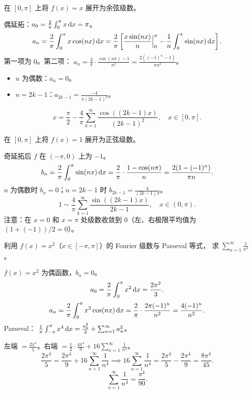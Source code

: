 \documentclass{ctexart}
\begin{document}
\begin{exercise}
  在 $[0,\pi]$ 上将 $f(x) = x$ 展开为余弦级数。
\end{exercise}

\begin{solution}
  偶延拓：$a_0 = \frac{2}{\pi}\int_0^\pi x \,\mathrm{d} x = \pi$。
  \[
    a_n = \frac{2}{\pi}\int_0^\pi x\cos(nx) \,\mathrm{d} x
    = \frac{2}{\pi}\left[ \frac{x\sin(nx)}{n}\Big|_0^\pi - \frac{1}{n}\int_0^\pi\sin(nx)\,\mathrm{d} x \right].
  \]
  第一项为 $0$。第二项：
  $a_n = \frac{2}{\pi}\cdot\frac{\cos(n\pi)-1}{n^2}
  = \frac{2((-1)^n-1)}{\pi n^2}$。
  \begin{itemize}
    \item $n$ 为偶数：$a_n = 0$。
    \item $n = 2k-1$：$a_{2k-1} = \frac{-4}{\pi(2k-1)^2}$。
  \end{itemize}
  \[
    x = \frac{\pi}{2} - \frac{4}{\pi}\sum_{k=1}^\infty \frac{\cos((2k-1)x)}{(2k-1)^2}, \quad x \in [0,\pi].
  \]
\end{solution}

\begin{exercise}
  在 $[0,\pi]$ 上将 $f(x) = 1$ 展开为正弦级数。
\end{exercise}

\begin{solution}
  奇延拓后 $f$ 在 $(-\pi,0)$ 上为 $-1$。
  \[
    b_n = \frac{2}{\pi}\int_0^\pi \sin(nx) \,\mathrm{d} x
    = \frac{2}{\pi}\cdot\frac{1-\cos(n\pi)}{n}
    = \frac{2(1-(-1)^n)}{\pi n}.
  \]
  $n$ 为偶数时 $b_n=0$；$n=2k-1$ 时 $b_{2k-1} = \frac{4}{(2k-1)\pi}$。
  \[
    1 \sim \frac{4}{\pi}\sum_{k=1}^\infty \frac{\sin((2k-1)x)}{2k-1}, \quad x \in (0,\pi).
  \]
  注意：在 $x=0$ 和 $x=\pi$ 处级数收敛到 $0$（左、右极限平均值为 $(1+(-1))/2 = 0$）。
\end{solution}

\begin{exercise}
  利用 $f(x) = x^2$（$x \in [-\pi,\pi]$）的 Fourier 级数与 Parseval 等式，
  求 $\sum_{n=1}^\infty \frac{1}{n^4}$。
\end{exercise}

\begin{solution}
  $f(x) = x^2$ 为偶函数，$b_n = 0$。
  \[
    a_0 = \frac{2}{\pi}\int_0^\pi x^2 \,\mathrm{d} x = \frac{2\pi^2}{3}.
  \]
  \[
    a_n = \frac{2}{\pi}\int_0^\pi x^2\cos(nx) \,\mathrm{d} x
    = \frac{2}{\pi}\cdot\frac{2\pi(-1)^n}{n^2}
    = \frac{4(-1)^n}{n^2}.
  \]
  Parseval：
  $\frac{1}{\pi}\int_{-\pi}^\pi x^4 \,\mathrm{d} x
  = \frac{a_0^2}{2} + \sum_{n=1}^\infty a_n^2$。

  左端 $= \frac{2\pi^4}{5}$。右端 $= \frac{1}{2}\cdot\frac{4\pi^4}{9} + 16\sum_{n=1}^\infty\frac{1}{n^4}$。
  \[
    \frac{2\pi^4}{5} = \frac{2\pi^4}{9} + 16\sum_{n=1}^\infty\frac{1}{n^4}
    \implies 16\sum_{n=1}^\infty\frac{1}{n^4} = \frac{2\pi^4}{5} - \frac{2\pi^4}{9}
    = \frac{8\pi^4}{45}.
  \]
  \[
    \sum_{n=1}^\infty \frac{1}{n^4} = \frac{\pi^4}{90}.
  \]
\end{solution}
\end{document}
